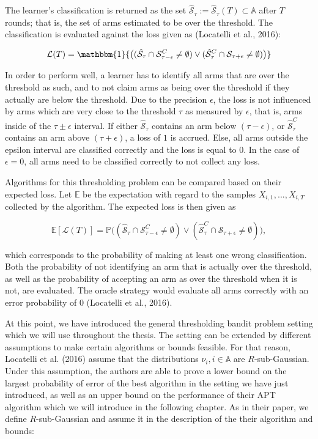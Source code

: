 \documentclass[11pt,]{article}
\begin{document}
The learner's classification is returned as the set
\(\hat{\mathcal{S}}_{\tau} := \hat{\mathcal{S}}_{\tau}(T) \subset \mathbb{A}\)
after \(T\) rounds; that is, the set of arms estimated to be over the
threshold. The classification is evaluated against the loss given as
(Locatelli et al., 2016):

\[
\mathcal{L}(T) = \mathbbm{1}{\big((\hat{\mathcal{S}}_{\tau} \cap \mathcal{S}_{\tau-\epsilon}^C \neq \emptyset) \lor (\hat{\mathcal{S}}_{\tau}^C \cap \mathcal{S}_{\tau+\epsilon} \neq \emptyset)\big)}
\]

In order to perform well, a learner has to identify all arms that are
over the threshold as such, and to not claim arms as being over the
threshold if they actually are below the threshold. Due to the precision
\(\epsilon\), the loss is not influenced by arms which are very close to
the threshold \(\tau\) as measured by \(\epsilon\), that is, arms inside
of the \(\tau \pm \epsilon\) interval. If either
\(\hat{\mathcal{S}}_{\tau}\) contains an arm below
\((\tau - \epsilon)\), or \(\hat{\mathcal{S}}^C_{\tau}\) contains an arm
above \((\tau + \epsilon)\), a loss of \(1\) is accrued. Else, all arms
outside the epsilon interval are classified correctly and the loss is
equal to \(0\). In the case of \(\epsilon = 0\), all arms need to be
classified correctly to not collect any loss.

Algorithms for this thresholding problem can be compared based on their
expected loss. Let \(\mathbb{E}\) be the expectation with regard to the
samples \(X_{i,1}, ..., X_{i,T}\) collected by the algorithm. The
expected loss is then given as

\[
\mathbb{E}[\mathcal{L}(T)] = \mathbb{P}\big((\hat{\mathcal{S}}_{\tau} \cap \mathcal{S}_{\tau-\epsilon}^C \neq \emptyset) \lor(\hat{\mathcal{S}}_{\tau}^C \cap \mathcal{S}_{\tau+\epsilon} \neq \emptyset)\big),
\]

which corresponds to the probability of making at least one wrong
classification. Both the probability of not identifying an arm that is
actually over the threshold, as well as the probability of accepting an
arm as over the threshold when it is not, are evaluated. The oracle
strategy would evaluate all arms correctly with an error probability of
\(0\) (Locatelli et al., 2016).

At this point, we have introduced the general thresholding bandit
problem setting which we will use throughout the thesis. The setting can
be extended by different assumptions to make certain algorithms or
bounds feasible. For that reason, Locatelli et al. (2016) assume that
the distributions \(\nu_i, i \in \mathbb{A}\) are \(R\)-sub-Gaussian.
Under this assumption, the authors are able to prove a lower bound on
the largest probability of error of the best algorithm in the setting we
have just introduced, as well as an upper bound on the performance of
their APT algorithm which we will introduce in the following chapter. As
in their paper, we define \(R\)-sub-Gaussian and assume it in the
description of the their algorithm and bounds:
\end{document}
